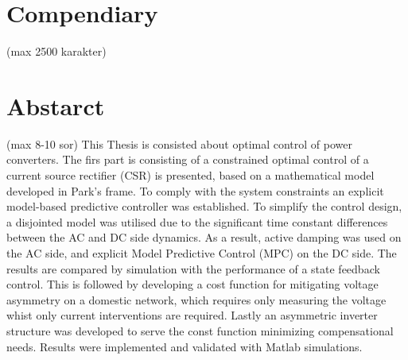 \thispagestyle{plain}
\chapter*{Compendiary}
 (max 2500 karakter)

\newpage

\thispagestyle{plain}
\chapter*{Abstarct}
 (max 8-10 sor)
This Thesis is consisted about optimal control of power converters. The firs part is consisting of a constrained optimal control of a current source rectifier (CSR) is presented, based on a mathematical model developed in Park's frame. To comply with the system constraints an explicit model-based predictive controller was established. To simplify the control design, a disjointed model was utilised due to the significant time constant differences between the AC and DC side dynamics. As a result, active damping was used on the AC side, and explicit Model Predictive Control (MPC) on the DC side. The results are compared by simulation with the performance of a state feedback control. This is followed by developing a cost function for mitigating voltage asymmetry on a domestic network, which requires only measuring the voltage whist only current interventions are required. Lastly an asymmetric inverter structure was developed to serve the const function minimizing compensational needs. Results were implemented and validated with Matlab simulations.

%


